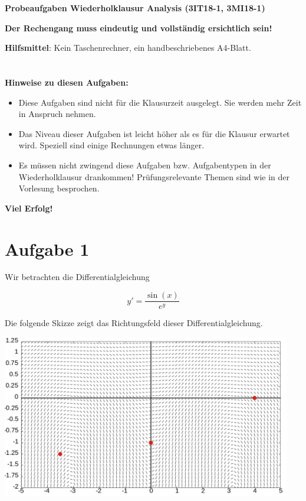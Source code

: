 \documentclass[12pt]{article}
\begin{document}
\thispagestyle{firstpage}

\begin{center}
{\bf {\large Probeaufgaben Wiederholklausur Analysis (3IT18-1, 3MI18-1)}}
\end{center}

\begin{center}
\textbf {Der Rechengang muss eindeutig und vollständig ersichtlich sein!}
\end{center}

\textbf{Hilfsmittel}: Kein Taschenrechner, ein handbeschriebenes A4-Blatt.
\\
\\
\\
\textbf{Hinweise zu diesen Aufgaben:}

\begin{itemize}
\item Diese Aufgaben sind nicht für die Klausurzeit ausgelegt. Sie werden mehr Zeit in Anspruch nehmen.
\item Das Niveau dieser Aufgaben ist leicht höher als es für die Klausur erwartet wird. Speziell sind einige Rechnungen etwas länger.
\item Es müssen nicht zwingend diese Aufgaben bzw. Aufgabentypen in der Wiederholklausur drankommen! Prüfungsrelevante Themen sind wie in der Vorlesung besprochen.
\end{itemize}

\begin{center}
{\bf {\large Viel Erfolg!}}
\end{center}

\newpage
\section* {Aufgabe 1}

Wir betrachten die Differentialgleichung

$$y' = \frac{\sin(x)}{e^y}$$

Die folgende Skizze zeigt das Richtungsfeld dieser Differentialgleichung.


\begin{center}
\includegraphics[width=0.95\textwidth]{slopefield.png}
\end{center}
\end{document}
